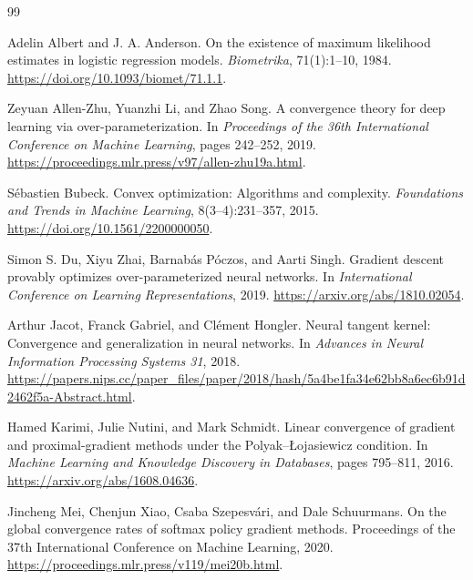 \documentclass[11pt,twoside]{article}
\theoremstyle{definition}
\theoremstyle{remark}
\begin{document}
\clearpage
\setlength{\bibsep}{4pt}
\begin{thebibliography}{99}

Adelin Albert and J. A. Anderson.
\newblock On the existence of maximum likelihood estimates in logistic
regression models.
\newblock \emph{Biometrika}, 71(1):1--10, 1984.
\newblock \url{https://doi.org/10.1093/biomet/71.1.1}.

Zeyuan Allen-Zhu, Yuanzhi Li, and Zhao Song.
\newblock A convergence theory for deep learning via over-parameterization.
\newblock In \emph{Proceedings of the 36th International Conference on
Machine Learning}, pages 242--252, 2019.
\newblock \url{https://proceedings.mlr.press/v97/allen-zhu19a.html}.

S\'ebastien Bubeck.
\newblock Convex optimization: Algorithms and complexity.
\newblock \emph{Foundations and Trends in Machine Learning}, 8(3--4):231--357,
2015.
\newblock \url{https://doi.org/10.1561/2200000050}.

Simon S. Du, Xiyu Zhai, Barnab\'as P\'oczos, and Aarti Singh.
\newblock Gradient descent provably optimizes over-parameterized neural
networks.
\newblock In \emph{International Conference on Learning Representations},
2019.
\newblock \url{https://arxiv.org/abs/1810.02054}.

Arthur Jacot, Franck Gabriel, and Cl\'ement Hongler.
\newblock Neural tangent kernel: Convergence and generalization in neural
networks.
\newblock In \emph{Advances in Neural Information Processing Systems 31},
2018.
\newblock
\url{https://papers.nips.cc/paper_files/paper/2018/hash/5a4be1fa34e62bb8a6ec6b91d2462f5a-Abstract.html}.

Hamed Karimi, Julie Nutini, and Mark Schmidt.
\newblock Linear convergence of gradient and proximal-gradient methods under
the Polyak--\L{}ojasiewicz condition.
\newblock In \emph{Machine Learning and Knowledge Discovery in Databases},
pages 795--811, 2016.
\newblock \url{https://arxiv.org/abs/1608.04636}.

Jincheng Mei, Chenjun Xiao, Csaba Szepesv\'ari, and Dale Schuurmans.
\newblock On the global convergence rates of softmax policy gradient methods.
\newblock Proceedings of the 37th International Conference on Machine
Learning, 2020.
\newblock \url{https://proceedings.mlr.press/v119/mei20b.html}.


\end{thebibliography}
\end{document}
